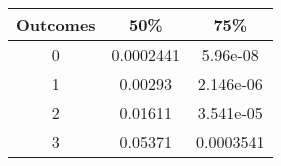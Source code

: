 \documentclass[]{article}
\begin{document}
\begin{longtable}[]{@{}ccc@{}}
\toprule
\begin{minipage}[b]{0.14\columnwidth}\centering\strut
Outcomes\strut
\end{minipage} & \begin{minipage}[b]{0.13\columnwidth}\centering\strut
50\%\strut
\end{minipage} & \begin{minipage}[b]{0.13\columnwidth}\centering\strut
75\%\strut
\end{minipage}\tabularnewline
\midrule
\endhead
\begin{minipage}[t]{0.14\columnwidth}\centering\strut
0\strut
\end{minipage} & \begin{minipage}[t]{0.13\columnwidth}\centering\strut
0.0002441\strut
\end{minipage} & \begin{minipage}[t]{0.13\columnwidth}\centering\strut
5.96e-08\strut
\end{minipage}\tabularnewline
\begin{minipage}[t]{0.14\columnwidth}\centering\strut
1\strut
\end{minipage} & \begin{minipage}[t]{0.13\columnwidth}\centering\strut
0.00293\strut
\end{minipage} & \begin{minipage}[t]{0.13\columnwidth}\centering\strut
2.146e-06\strut
\end{minipage}\tabularnewline
\begin{minipage}[t]{0.14\columnwidth}\centering\strut
2\strut
\end{minipage} & \begin{minipage}[t]{0.13\columnwidth}\centering\strut
0.01611\strut
\end{minipage} & \begin{minipage}[t]{0.13\columnwidth}\centering\strut
3.541e-05\strut
\end{minipage}\tabularnewline
\begin{minipage}[t]{0.14\columnwidth}\centering\strut
3\strut
\end{minipage} & \begin{minipage}[t]{0.13\columnwidth}\centering\strut
0.05371\strut
\end{minipage} & \begin{minipage}[t]{0.13\columnwidth}\centering\strut
0.0003541\strut
\end{minipage}\tabularnewline

\end{longtable}
\end{document}
